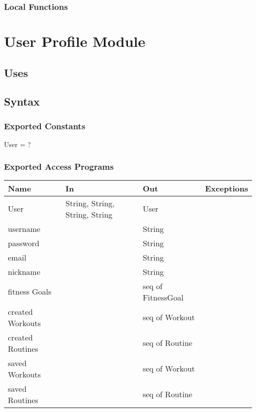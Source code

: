 \documentclass[12pt, titlepage]{article}
\begin{document}
\subsubsection{Local Functions}

\newpage

\section{User Profile Module}

\subsection{Uses}

\subsection{Syntax}

\subsubsection{Exported Constants}
User = ?
\subsubsection{Exported Access Programs}

\begin{center}
	\begin{tabular}{p{4cm} p{4cm} p{3cm} p{2cm}}
		\hline
		\textbf{Name} & \textbf{In} & \textbf{Out} & \textbf{Exceptions} \\
		\hline
		User & String, String, String, String & User &  \\
		username &  & String &  \\
 		password &  & String &  \\
 		email &  & String &  \\
 		nickname &  & String &  \\
 		fitness Goals &  & seq of FitnessGoal &  \\
 		created Workouts &  & seq of Workout &  \\
 		created Routines &  & seq of Routine &  \\
 		saved Workouts &  & seq of Workout &  \\
 		saved Routines &  & seq of Routine &  \\
		\hline
	\end{tabular}
\end{center}
\end{document}
